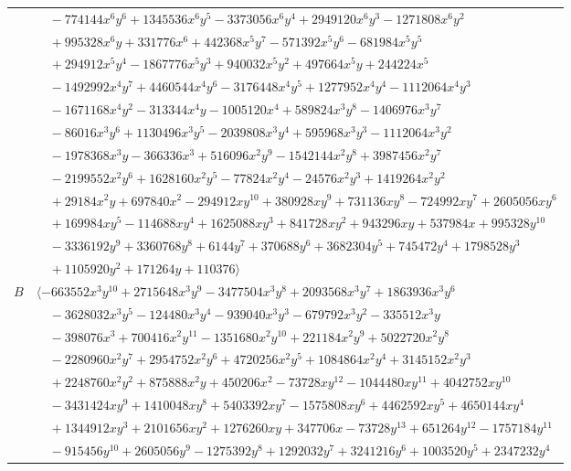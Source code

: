 \documentclass[11pt]{article}
\begin{document}
\begin{longtable}{@{}ll@{}}
 & $\quad -774144x^{6}y^{6}+1345536x^{6}y^{5}-3373056x^{6}y^{4}+2949120x^{6}y^{3}-1271808x^{6}y^{2}$\\
 & $\quad +995328x^{6}y+331776x^{6}+442368x^{5}y^{7}-571392x^{5}y^{6}-681984x^{5}y^{5}$\\
 & $\quad +294912x^{5}y^{4}-1867776x^{5}y^{3}+940032x^{5}y^{2}+497664x^{5}y+244224x^{5}$\\
 & $\quad -1492992x^{4}y^{7}+4460544x^{4}y^{6}-3176448x^{4}y^{5}+1277952x^{4}y^{4}-1112064x^{4}y^{3}$\\
 & $\quad -1671168x^{4}y^{2}-313344x^{4}y-1005120x^{4}+589824x^{3}y^{8}-1406976x^{3}y^{7}$\\
 & $\quad -86016x^{3}y^{6}+1130496x^{3}y^{5}-2039808x^{3}y^{4}+595968x^{3}y^{3}-1112064x^{3}y^{2}$\\
 & $\quad -1978368x^{3}y-366336x^{3}+516096x^{2}y^{9}-1542144x^{2}y^{8}+3987456x^{2}y^{7}$\\
 & $\quad -2199552x^{2}y^{6}+1628160x^{2}y^{5}-77824x^{2}y^{4}-24576x^{2}y^{3}+1419264x^{2}y^{2}$\\
 & $\quad +29184x^{2}y+697840x^{2}-294912xy^{10}+380928xy^{9}+731136xy^{8}-724992xy^{7}+2605056xy^{6}$\\
 & $\quad +169984xy^{5}-114688xy^{4}+1625088xy^{3}+841728xy^{2}+943296xy+537984x+995328y^{10}$\\
 & $\quad -3336192y^{9}+3360768y^{8}+6144y^{7}+370688y^{6}+3682304y^{5}+745472y^{4}+1798528y^{3}$\\
 & $\quad +1105920y^{2}+171264y+110376\rangle$\\
$B$ & $\langle -663552x^{3}y^{10}+2715648x^{3}y^{9}-3477504x^{3}y^{8}+2093568x^{3}y^{7}+1863936x^{3}y^{6}$\\
 & $\quad -3628032x^{3}y^{5}-124480x^{3}y^{4}-939040x^{3}y^{3}-679792x^{3}y^{2}-335512x^{3}y$\\
 & $\quad -398076x^{3}+700416x^{2}y^{11}-1351680x^{2}y^{10}+221184x^{2}y^{9}+5022720x^{2}y^{8}$\\
 & $\quad -2280960x^{2}y^{7}+2954752x^{2}y^{6}+4720256x^{2}y^{5}+1084864x^{2}y^{4}+3145152x^{2}y^{3}$\\
 & $\quad +2248760x^{2}y^{2}+875888x^{2}y+450206x^{2}-73728xy^{12}-1044480xy^{11}+4042752xy^{10}$\\
 & $\quad -3431424xy^{9}+1410048xy^{8}+5403392xy^{7}-1575808xy^{6}+4462592xy^{5}+4650144xy^{4}$\\
 & $\quad +1344912xy^{3}+2101656xy^{2}+1276260xy+347706x-73728y^{13}+651264y^{12}-1757184y^{11}$\\
 & $\quad -915456y^{10}+2605056y^{9}-1275392y^{8}+1292032y^{7}+3241216y^{6}+1003520y^{5}+2347232y^{4}$\\

\end{longtable}
\end{document}
